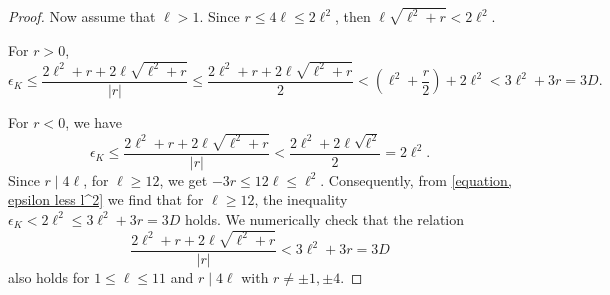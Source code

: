 \documentclass[10pt,a4paper]{amsart}
\begin{document}
\begin{proof}
Now assume that $\ell >1$. Since $r \leq 4 \ell \leq 2 \ell^2$, then $\ell \sqrt{\ell^2+r} <  2 \ell^2$.
 
 \noindent
For $r>0$,
 		\begin{equation*}
 			\epsilon_K \leq 	\frac{	2\ell^2+r + 2 \ell \sqrt{\ell^2+r}}{|r|} \leq 	\frac{	2\ell^2+r + 2 \ell \sqrt{\ell^2+r}}{2}  < \left(	\ell^2+ \frac{r}{2} \right) + 2 \ell^2 < 3 \ell^2 + 3r=3D.
 		\end{equation*}
 		
  \noindent
 	For $r <0$, we have
 			\begin{equation} \label{equation, epsilon less l^2}
 			\epsilon_K \leq 	\frac{	2\ell^2+r + 2 \ell \sqrt{\ell^2+r}}{|r|} <	\frac{	2\ell^2 + 2 \ell \sqrt{\ell^2}}{2}= 2\ell^2.
 		\end{equation}
 	Since $r \mid 4 \ell$, for $\ell \geq 12$, we get
 			$-3 r \leq 12 \ell \leq \ell^2.$
 		Consequently, from \eqref{equation, epsilon less l^2} we find that for $\ell \geq 12$, the inequality $\epsilon_K < 2 \ell^2 \leq 3 \ell^2+3r=3D$ holds.
 	We numerically check that the relation
 	\begin{equation*}
 		\frac{	2\ell^2+r + 2 \ell \sqrt{\ell^2+r}}{|r|} < 3 \ell^2+3r=3D
 	\end{equation*}
 	also holds for $1 \leq \ell \leq 11$ and $r \mid 4 \ell$ with $r \neq \pm 1, \pm 4$.
 \end{proof}
\end{document}
